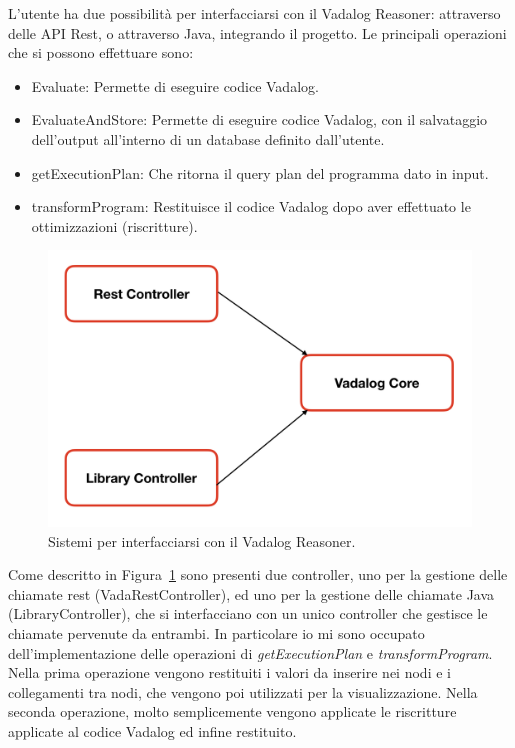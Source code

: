 L'utente ha due possibilità per interfacciarsi con il Vadalog Reasoner: attraverso delle API Rest, o attraverso Java, integrando il progetto. \newline
Le principali operazioni che si possono effettuare sono: 
\begin{itemize}
	\item Evaluate: Permette di eseguire codice Vadalog.
	\item EvaluateAndStore: Permette di eseguire codice Vadalog, con il salvataggio dell'output all'interno di un database definito dall'utente.
	\item getExecutionPlan: Che ritorna il query plan del programma dato in input.
	\item transformProgram: Restituisce il codice Vadalog dopo aver effettuato le ottimizzazioni (riscritture).
\end{itemize}
\begin{figure}[h!]
	\centering
	\includegraphics[width=0.8\linewidth]{figure/architettura-2}
	\caption{Sistemi per interfacciarsi con il Vadalog Reasoner.}
	\label{fig:architettura_2}
\end{figure}
Come descritto in Figura~\ref{fig:architettura_2} sono presenti due controller, uno per la gestione delle chiamate rest (VadaRestController), ed uno per la gestione delle chiamate Java (LibraryController), che si interfacciano con un unico controller che gestisce le chiamate pervenute da entrambi. \newline
In particolare io mi sono occupato dell'implementazione delle operazioni di \emph{getExecutionPlan} e \emph{transformProgram}. Nella prima operazione vengono restituiti i valori da inserire nei nodi e i collegamenti tra nodi, che vengono poi utilizzati per la visualizzazione. Nella seconda operazione, molto semplicemente vengono applicate le riscritture applicate al codice Vadalog ed infine restituito.


